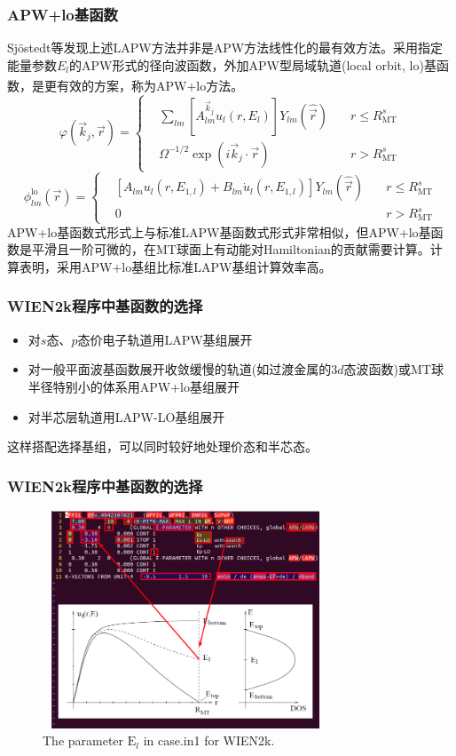 \documentclass[cjk,slidestop,compress,mathserif,blue]{beamer}
\newcommand{\upcite}[1]{\hspace{0ex}\textsuperscript{\cite{#1}}} %
\begin{document}
\frame
{
\frametitle{\textrm{APW+lo}基函数}
\textrm{Sj\"ostedt}等发现上述\textrm{LAPW}方法并非是\textrm{APW}方法线性化的最有效方法。采用指定能量参数$E_l$的\textrm{APW}形式的径向波函数，外加\textrm{APW}型局域轨道(\textrm{local orbit, lo})基函数，是更有效的方案，称为\textrm{APW+lo}方法\upcite{SSC114-15_2000}。
$$  \varphi(\vec k_j,\vec r)=\left\{
  \begin{aligned}
    &\sum_{lm}[A^{\vec k_j}_{lm}u_l(r,E_l)]Y_{lm}(\hat{\vec r})\quad&r\leqslant R_{\mathrm{MT}}^s\\
    &\Omega^{-1/2}\exp(i\vec k_j\cdot\vec r) &r>R_{\mathrm{MT}}^s
  \end{aligned}\right.
  \label{eq:APW-basis}
$$
$$  \phi_{lm}^{\mathrm{lo}}(\vec r)=\left\{
  \begin{aligned}
  &[A_{lm}u_l(r,E_{1,l})+B_{lm}\dot u_l(r,E_{1,l})]Y_{lm}(\hat{\vec r})\quad&r\leqslant R_{\mathrm{MT}}^s\\
  &0&r>R_{\mathrm{MT}}^s
  \end{aligned}
\right.$$
\textrm{APW+lo}基函数式形式上与标准\textrm{LAPW}基函数式形式非常相似，但\textrm{APW+lo}基函数是平滑且一阶可微的，在\textrm{MT}球面上有动能对\textrm{Hamiltonian}的贡献需要计算。计算表明，采用\textrm{APW+lo}基组比标准\textrm{LAPW}基组计算效率高。
}

\frame
{
\frametitle{\textrm{WIEN2k}程序中基函数的选择}
\vskip 10pt
\begin{itemize}
\setlength{\itemsep}{15pt}
	\item 对$s$态、$p$态价电子轨道用\textrm{LAPW}基组展开
	\item 对一般平面波基函数展开收敛缓慢的轨道(如过渡金属的3$d$态波函数)或\textrm{MT}球半径特别小的体系用\textrm{APW+lo}基组展开
	\item 对半芯层轨道用\textrm{LAPW-LO}基组展开
\end{itemize}
这样搭配选择基组，可以同时较好地处理价态和半芯态。
}

\frame
{
\frametitle{\textrm{WIEN2k}程序中基函数的选择}
\begin{figure}[h!]
	\vspace{-15pt}
\centering
\hspace{15pt}
\includegraphics[height=2.55in,width=3.35in,viewport=10 30 750 605,clip]{Figures/WIEN2k-in1.png}
\caption{\small \textrm{The parameter $\mathrm{E}_l$ in case.in1 for WIEN2k.}}%
\label{WIEN2k-in1}
\end{figure}
}
\end{document}
